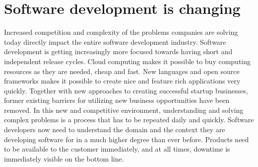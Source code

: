 \chapter{Software development is changing}
\label{ch:introduction}
Increased competition and complexity of the problems companies are solving today directly impact the entire software development industry. Software development is getting increasingly more focused towards having short and independent release cycles. Cloud computing makes it possible to buy computing resources as they are needed, cheap and fast. New languages and open source frameworks makes it possible to create nice and feature rich applications very quickly. Together with new approaches to creating successful startup businesses, former existing barriers for utilizing new business opportunities have been removed. In this new and competitive environment, understanding and solving complex problems is a process that has to be repeated daily and quickly. Software developers now need to understand the domain and the context they are developing software for in a much higher degree than ever before. Products need to be available to the customer immediately, and at all times, downtime is immediately visible on the bottom line.



